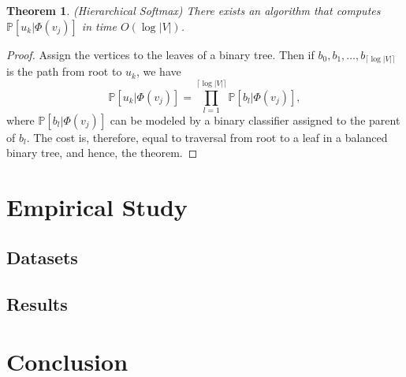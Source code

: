 \documentclass{article}
\newtheorem{theorem}{Theorem}[section]
\begin{document}
\begin{theorem}
  (Hierarchical Softmax) There exists an algorithm that computes \(\mathbb{P}[u_k|\Phi(v_j)]\) in time \(O(\log |V|)\).
\end{theorem}
\begin{proof}
  Assign the vertices to the leaves of a binary tree. Then if \(b_0, b_1, \ldots, b_{\lceil \log|V|\rceil}\)
  is the path from root to \(u_k\), we have
  \[
      \mathbb{P}[u_k|\Phi(v_j)]=\prod_{l=1}^{\lceil \log|V|\rceil} \mathbb{P}[b_l|\Phi(v_j)],
  \]
  where \(\mathbb{P}[b_l|\Phi(v_j)]\) can be modeled by a binary classifier assigned to the parent of \(b_l\).
  The cost is, therefore, equal to traversal from root to a leaf in a balanced binary tree, and hence, the theorem.
\end{proof}

\section{Empirical Study}

\subsection{Datasets}

\subsection{Results}

\section{Conclusion}

\newpage


\end{document}
